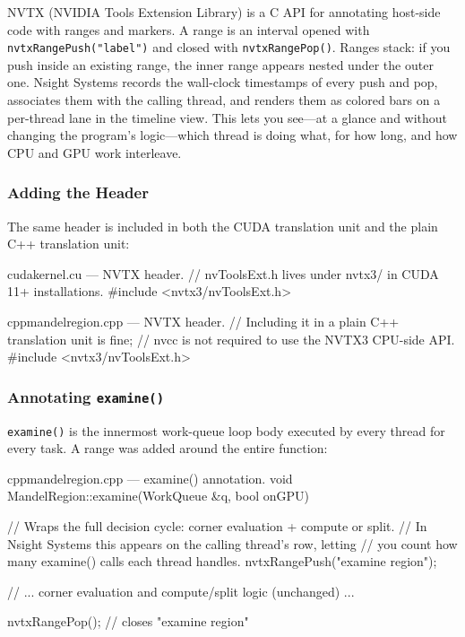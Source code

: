 \documentclass[
	english,
	letterpaper, oneside
]{article}
\begin{document}
NVTX (NVIDIA Tools Extension Library) is a C API for annotating host-side
code with ranges and markers. A range is an interval opened
with \texttt{nvtxRangePush("label")} and closed with \texttt{nvtxRangePop()}.
Ranges stack: if you push inside an existing range, the inner range appears
nested under the outer one. Nsight Systems records the wall-clock timestamps
of every push and pop, associates them with the calling thread, and renders
them as colored bars on a per-thread lane in the timeline view. This lets
you see—at a glance and without changing the program's logic—which thread is
doing what, for how long, and how CPU and GPU work interleave.

\subsubsection{Adding the Header}

The same header is included in both the CUDA translation unit and the plain
C++ translation unit:

\begin{sourcecode}{cuda}{kernel.cu — NVTX header.}
// nvToolsExt.h lives under nvtx3/ in CUDA 11+ installations.
#include <nvtx3/nvToolsExt.h>
\end{sourcecode}

\begin{sourcecode}{cpp}{mandelregion.cpp — NVTX header.}
// Including it in a plain C++ translation unit is fine;
// nvcc is not required to use the NVTX3 CPU-side API.
#include <nvtx3/nvToolsExt.h>
\end{sourcecode}

\subsubsection{Annotating \texttt{examine()}}

\texttt{examine()} is the innermost work-queue loop body executed by every
thread for every task. A range was added around the entire function:

\begin{sourcecode}{cpp}{mandelregion.cpp — examine() annotation.}
void MandelRegion::examine(WorkQueue &q, bool onGPU)
{
    // Wraps the full decision cycle: corner evaluation + compute or split.
    // In Nsight Systems this appears on the calling thread's row, letting
    // you count how many examine() calls each thread handles.
    nvtxRangePush("examine region");

    // ... corner evaluation and compute/split logic (unchanged) ...

    nvtxRangePop(); // closes "examine region"
}
\end{sourcecode}
\end{document}
